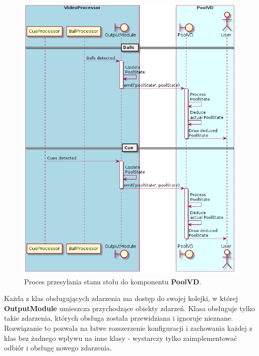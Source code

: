 \documentclass[12pt]{article}
\begin{document}
\begin{figure}[!htb]
    \centering
    \includegraphics[width=15cm]{./diagrams/out/pool_state_sd.png}
    \caption{Proces przesyłania stanu stołu do komponentu \textbf{PoolVD}.}
    \label{pool_state_sd}
\end{figure}


Każda z klas obsługujących zdarzenia ma dostęp do swojej kolejki, w której \textbf{OutputModule} umieszcza przychodzące obiekty zdarzeń. Klasa obsługuje tylko takie zdarzenia, których obsługa została przewidziana i ignoruje nieznane. Rozwiązanie to pozwala na łatwe rozszerzenie konfiguracji i zachowania każdej z klas bez żadnego wpływu na inne klasy - wystarczy tylko zaimplementować odbiór i obsługę nowego zdarzenia.
\end{document}
